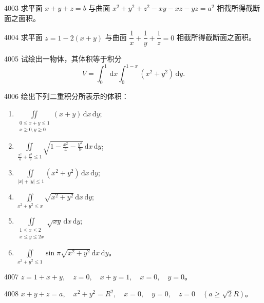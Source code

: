 \begin{prob}[M]{4003}
求平面 $x + y + z = b$ 与曲面 $x^2 + y^2 + z^2 - xy - xz - yz = a^2$ 相截所得截断面之面积。
\end{prob}

\begin{prob}[M]{4004}
求平面 $z = 1 - 2(x + y)$ 与曲面 $\dfrac{1}{x} + \dfrac{1}{y} + \dfrac{1}{z} = 0$ 相截所得截断面之面积。
\end{prob}


\begin{prob}[M]{4005}
试绘出一物体，其体积等于积分
\[
V = \int_0^1 \,\mathrm{d}x \int_0^{1 - x} (x^2 + y^2) \,\mathrm{d}y.
\]
\end{prob}

\begin{prob}[L]{4006}
绘出下列二重积分所表示的体积：
\begin{enumerate}[label=(\alph*), itemsep=2pt, topsep=3pt]
\item $\displaystyle \iint\limits_{\substack{0 \leqslant x + y \leqslant 1 \\ x \geqslant 0, y \geqslant 0}} (x + y) \,\mathrm{d}x\,\mathrm{d}y$;
\item $\displaystyle \iint\limits_{\frac{x^2}{4} + \frac{y^2}{9} \leqslant 1} \sqrt{1 - \frac{x^2}{4} - \frac{y^2}{9}} \,\mathrm{d}x\,\mathrm{d}y$;
\item $\displaystyle \iint\limits_{|x| + |y| \leqslant 1} (x^2 + y^2) \,\mathrm{d}x\,\mathrm{d}y$;
\item $\displaystyle \iint\limits_{x^2 + y^2 \leqslant x} \sqrt{x^2 + y^2} \,\mathrm{d}x\,\mathrm{d}y$;
\item $\displaystyle \iint\limits_{\substack{1 \leqslant x \leqslant 2 \\ x \leqslant y \leqslant 2x}} \sqrt{xy} \,\mathrm{d}x\,\mathrm{d}y$;
\item $\displaystyle \iint\limits_{x^2 + y^2 \leqslant 1} \sin \pi \sqrt{x^2 + y^2} \,\mathrm{d}x\,\mathrm{d}y$。
\end{enumerate}
\end{prob}


\begin{prob}[S]{4007}
$z = 1 + x + y, \quad z = 0, \quad x + y = 1, \quad x = 0, \quad y = 0$。
\end{prob}

\begin{prob}[S]{4008}
$x + y + z = a, \quad x^2 + y^2 = R^2, \quad x = 0, \quad y = 0, \quad z = 0 \quad (a \geqslant \sqrt{2}R)$。
\end{prob}

